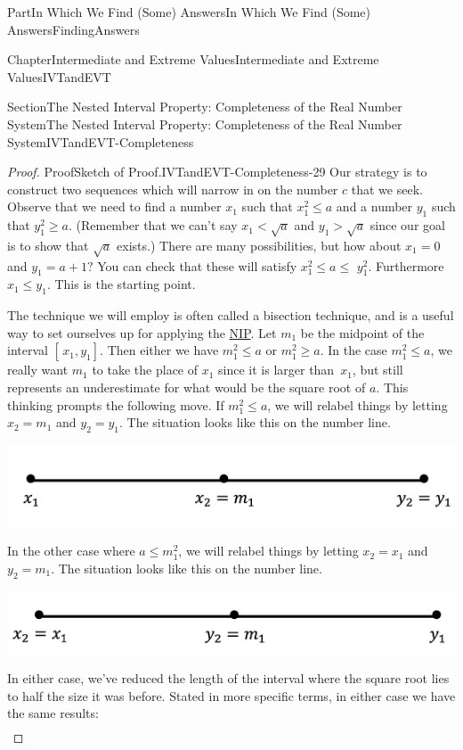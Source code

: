 \documentclass[oneside,10pt,]{book}
\numberwithin{equation}{part}
\newcommand{\lt}{<}
\newcommand{\gt}{>}
\begin{document}
\begin{partptx}{Part}{In Which We Find (Some) Answers}{}{In Which We Find (Some) Answers}{}{}{FindingAnswers}
\begin{chapterptx}{Chapter}{Intermediate and Extreme Values}{}{Intermediate and Extreme Values}{}{}{IVTandEVT}
\begin{sectionptx}{Section}{The Nested Interval Property: Completeness of the Real Number System}{}{The Nested Interval Property: Completeness of the Real Number System}{}{}{IVTandEVT-Completeness}
\begin{proof}{Proof}{Sketch of Proof.}{IVTandEVT-Completeness-29}
Our strategy is to construct two sequences which will narrow in on the number \(c\) that we seek.  Observe that we need to find a number \(x_1\) such that \(x_1^2\leq a\) and a number \(y_1\) such that \(y_1^2\geq a\).  (Remember that we can't say \(x_1\lt\sqrt{a}\) and \(y_1\gt\sqrt{a}\) since our goal is to show that \(\sqrt{a} \) exists.) There are many possibilities, but how about \(x_1=0\) and \(y_1=a+1?\) You can check that these will satisfy \(x_1^2\leq a\leq\) \(y_1^2\).  Furthermore \(x_1\leq
y_1\).  This is the starting point.%
\par
The technique we will employ is often called a bisection technique, and is a useful way to set ourselves up for applying the \hyperref[NIP]{NIP}. Let \(m_1\) be the midpoint of the interval \([\,x_1,y_1]\).  Then either we have \(m_1^2\leq
a\) or \(m_1^2\geq a\).  In the case \(m_1^2\leq a\), we really want \(m_1\) to take the place of \(x_1\) since it is larger than \(\,x_1\), but still represents an underestimate for what would be the square root of \(a\). This thinking prompts the following move.  If \(m_1^2\leq
a\), we will relabel things by letting \(x_2=m_1\) and \(y_2=y_1\).  The situation looks like this on the number line.%
\begin{image}{0.22}{0.56}{0.22}{}%
\includegraphics[width=\linewidth]{external/images/Ch6fig5.png}
\end{image}%
In the other case where \(a\leq m_1^2\), we will relabel things by letting \(x_2=x_1\) and \(y_2=m_1\).  The situation looks like this on the number line.%
\begin{image}{0.22}{0.56}{0.22}{}%
\includegraphics[width=\linewidth]{external/images/Ch6fig6.png}
\end{image}%
In either case, we've reduced the length of the interval where the square root lies to half the size it was before.  Stated in more specific terms, in either case we have the same results:%
\begin{align*}

\end{align*}
\end{proof}
\end{sectionptx}
\end{chapterptx}
\end{partptx}
\end{document}
